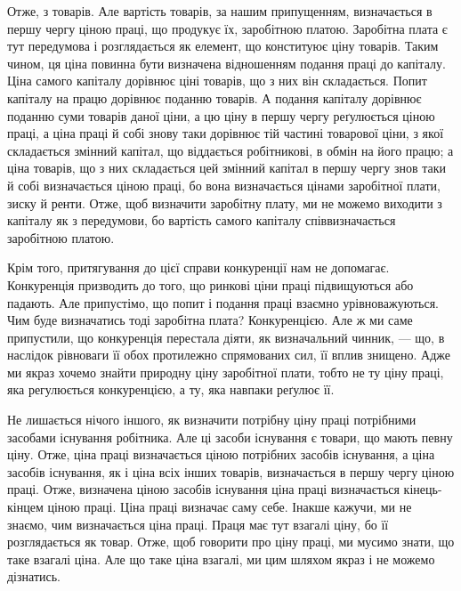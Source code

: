 Отже, з товарів. Але вартість товарів, за нашим припущенням, визначається
в першу чергу ціною праці, що продукує їх, заробітною платою. Заробітна плата
є тут передумова і розглядається як елемент, що конституює ціну товарів. Таким
чином, ця ціна повинна бути визначена відношенням подання праці до капіталу.
Ціна самого капіталу дорівнює ціні товарів, що з них він складається. Попит
капіталу на працю дорівнює поданню товарів. А подання капіталу дорівнює
поданню суми товарів даної ціни, а цю ціну в першу чергу реґулюється
ціною праці, а ціна праці й собі знову таки дорівнює тій частині товарової
ціни, з якої складається змінний капітал, що віддається робітникові, в
обмін на його працю; а ціна товарів, що з них складається цей змінний капітал
в першу чергу знов таки й собі визначається ціною праці, бо вона визначається
цінами заробітної плати, зиску й ренти. Отже, щоб визначити заробітну плату,
ми не можемо виходити з капіталу як з передумови, бо вартість самого капіталу
співвизначається заробітною платою.

Крім того, притягування до цієї справи конкуренції нам не допомагає.
Конкуренція призводить до того, що ринкові ціни праці підвищуються
або падають. Але припустімо, що попит і подання праці взаємно урівноважуються.
Чим буде визначатись тоді заробітна плата? Конкуренцією. Але ж
ми саме припустили, що конкуренція перестала діяти, як визначальний чинник,
— що, в наслідок рівноваги її обох протилежно спрямованих сил, її вплив
знищено. Адже ми якраз хочемо знайти природну ціну заробітної плати,
тобто не ту ціну праці, яка регулюється конкуренцією, а ту, яка навпаки
реґулює її.

Не лишається нічого іншого, як визначити потрібну ціну праці потрібними
засобами існування робітника. Але ці засоби існування є товари, що мають
певну ціну. Отже, ціна праці визначається ціною потрібних засобів існування,
а ціна засобів існування, як і ціна всіх інших товарів, визначається в першу
чергу ціною праці. Отже, визначена ціною засобів існування ціна праці визначається
кінець-кінцем ціною праці. Ціна праці визначає саму себе. Інакше кажучи,
ми не знаємо, чим визначається ціна праці. Праця має тут взагалі ціну,
бо її розглядається як товар. Отже, щоб говорити про ціну праці, ми мусимо
знати, що таке взагалі ціна. Але що таке ціна взагалі, ми цим шляхом якраз
і не можемо дізнатись.

